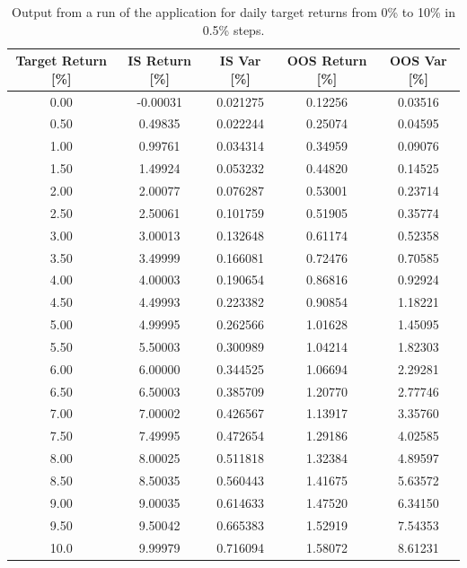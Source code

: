 \documentclass{article}
\begin{document}
\begin{center}
	\begin{table}[H]
\begin{tabular}{|c c c c c|} 
			\hline
			Target Return [\%] & IS Return  [\%]&	 IS Var [\%]  & OOS Return [\%]  & OOS Var [\%]  \\ [0.5ex] \hline \hline
			0.00  	 &	-0.00031  &	0.021275  	 &	0.12256  &	0.03516	\\ \hline
			0.50	 &	0.49835	  &	0.022244	 &	0.25074  &	0.04595	\\ \hline
			1.00	 &	0.99761   &	0.034314  	 &	0.34959  &	0.09076	\\ \hline
			1.50	 &	1.49924	  &	0.053232  	 &	0.44820  &	0.14525	\\ \hline
			2.00	 &	2.00077	  &	0.076287  	 &	0.53001  &	0.23714	\\ \hline
			2.50	 &	2.50061	  &	0.101759	 &	0.51905  &	0.35774		\\ \hline
			3.00	 &	3.00013	  &	0.132648	 &	0.61174  &	0.52358		\\ \hline
			3.50	 &	3.49999	  &	0.166081	 &	0.72476  &	0.70585		\\ \hline
			4.00	 &	4.00003	  &	0.190654	 &	0.86816  &	0.92924		\\ \hline
			4.50	 &	4.49993	  &	0.223382	 &	0.90854  &	1.18221		\\ \hline
			5.00	 &	4.99995	  &	0.262566	 &	1.01628	 &	1.45095		\\ \hline
			5.50	 &	5.50003	  &	0.300989	 &	1.04214	 &	1.82303		\\ \hline
			6.00	 &	6.00000	  &	0.344525	 &	1.06694	 &	2.29281		\\ \hline
			6.50	 &	6.50003	  &	0.385709	 &	1.20770	 &	2.77746		\\ \hline
			7.00	 &	7.00002	  &	0.426567	 &	1.13917	 &	3.35760		\\ \hline
			7.50	 &	7.49995	  &	0.472654	 &	1.29186	 &	4.02585		\\ \hline
			8.00	 &	8.00025	  &	0.511818	 &	1.32384	 &	4.89597		\\ \hline
			8.50 	 &	8.50035	  &	0.560443	 &	1.41675	 &	5.63572		\\ \hline
			9.00	 &	9.00035	  &	0.614633	 &	1.47520	 &	6.34150		\\ \hline
			9.50	 &	9.50042	  &	0.665383	 &	1.52919	 &	7.54353		\\ \hline
			10.0 	 &	9.99979	  &	0.716094	 &	1.58072	 &	8.61231 \\ [1ex]  \hline


\end{tabular}
\caption{Output from a run of the application for daily target returns from 0\% to 10\% in 0.5\% steps.}
\label{table:port_results}
	\end{table}
\end{center}
\end{document}
